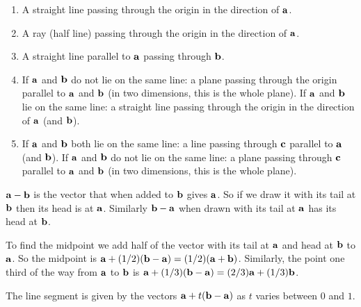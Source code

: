 \vspace{2mm}
{\begin{enumerate}
\renewcommand{\labelenumi}{(\roman{enumi})}
\item A straight line passing through the origin in the direction of $\aa$.
\item A ray (half line) passing through the origin in the direction of 
$\aa$.
\item A straight line parallel to $\aa$ passing through $\bb$.
\item If $\aa$ and $\bb$ do not lie on the same line:
a plane passing
through the origin parallel to $\aa$ and
$\bb$ (in two dimensions, this is the whole plane). 
If $\aa$ and $\bb$ lie on the same line: a
straight line passing through the origin in the direction of $\aa$ (and $\bb$).\par
\item If $\aa$ and $\bb$
both lie on the same line: a line passing through  $\cc$ parallel to
$\aa$ (and
$\bb$).  If $\aa$ and $\bb$ do not lie on the same line:
a plane passing
through $\cc$ parallel to $\aa$ and
$\bb$ (in two dimensions, this is the whole plane).
\end{enumerate}}

\vspace{2mm}
$\aa-\bb$ is the vector that when added to $\bb$ gives $\aa$. So if we draw it
with its tail at $\bb$ then its head is at $\aa$. Similarly $\bb - \aa$ when
drawn with its tail at $\aa$ has its head at $\bb$.


\vspace{2mm}
To find the midpoint we add half of the vector with its tail at $\aa$ and head
at $\bb$ to $\aa$. So the midpoint is $\aa + (1/2)(\bb-\aa)= (1/2)(\aa+\bb)$.
Similarly, the point one third of the way from $\aa$ to $\bb$ is
$\aa + (1/3)(\bb-\aa) = (2/3)\aa + (1/3)\bb$. 

\vspace{2mm}
The line segment is given by the vectors $\aa + t(\bb-\aa)$ as $t$ varies
between $0$ and $1$.

